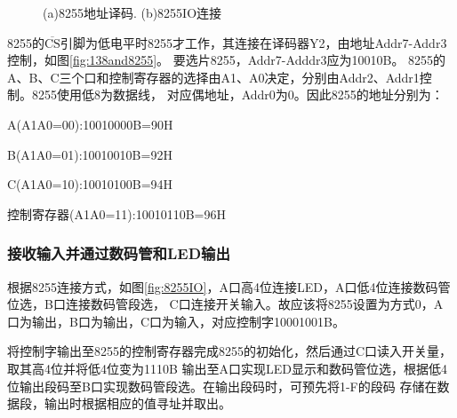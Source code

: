 \documentclass[12pt, a4paper, oneside]{ctexart}
\begin{document}
    \begin{figure}[!h]
        \centering
        \hfil
        \caption{(a)8255地址译码. (b)8255IO连接}
    \end{figure} 

    8255的$\overline{\text{CS}}$引脚为低电平时8255才工作，其连接在译码器Y2，由地址Addr7-Addr3控制，如图\ref{fig:138and8255}。
    要选片8255，Addr7-Adddr3应为10010B。
    8255的A、B、C三个口和控制寄存器的选择由A1、A0决定，分别由Addr2、Addr1控制。8255使用低8为数据线，
    对应偶地址，Addr0为0。因此8255的地址分别为：

    A(A1A0=00):10010000B=90H

    B(A1A0=01):10010010B=92H

    C(A1A0=10):10010100B=94H

    控制寄存器(A1A0=11):10010110B=96H
    \subsubsection{接收输入并通过数码管和LED输出}
    根据8255连接方式，如图\ref{fig:8255IO}，A口高4位连接LED，A口低4位连接数码管位选，B口连接数码管段选，
    C口连接开关输入。故应该将8255设置为方式0，A口为输出，B口为输出，C口为输入，对应控制字10001001B。

    将控制字输出至8255的控制寄存器完成8255的初始化，然后通过C口读入开关量，取其高4位并将低4位变为1110B
    输出至A口实现LED显示和数码管位选，根据低4位输出段码至B口实现数码管段选。在输出段码时，可预先将1-F的段码
    存储在数据段，输出时根据相应的值寻址并取出。
\end{document}
